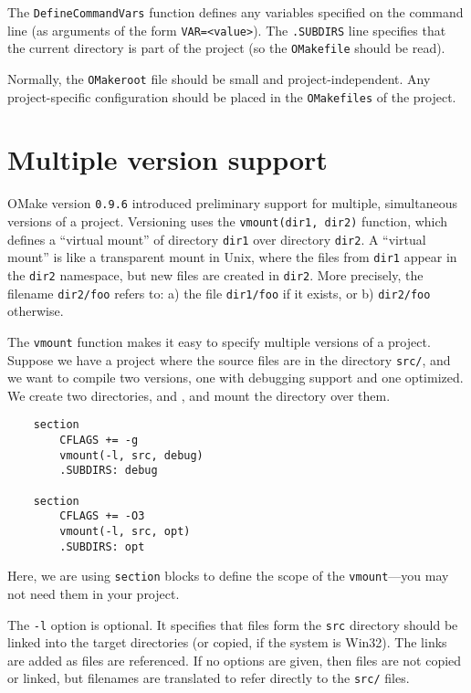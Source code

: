 The \verb+DefineCommandVars+ function defines any variables specified on the command line (as
arguments of the form \verb+VAR=<value>+).  The \verb+.SUBDIRS+ line specifies that the current
directory is part of the project (so the \verb+OMakefile+ should be read).

Normally, the \verb+OMakeroot+ file should be small and project-independent.  Any project-specific
configuration should be placed in the \verb+OMakefiles+ of the project.

\section{Multiple version support}

OMake version \verb+0.9.6+ introduced preliminary support for multiple, simultaneous versions of a
project.  Versioning uses the \verb+vmount(dir1, dir2)+ function, which defines a ``virtual mount''
of directory \verb+dir1+ over directory \verb+dir2+.  A ``virtual mount'' is like a transparent
mount in Unix, where the files from \verb+dir1+ appear in the \verb+dir2+ namespace, but new files
are created in \verb+dir2+.  More precisely, the filename \verb+dir2/foo+ refers to: a) the file
\verb+dir1/foo+ if it exists, or b) \verb+dir2/foo+ otherwise.

The \verb+vmount+ function makes it easy to specify multiple versions of a project.  Suppose we have
a project where the source files are in the directory \verb+src/+, and we want to compile two
versions, one with debugging support and one optimized.  We create two directories,  and
, and mount the  directory over them.

\begin{verbatim}
    section
        CFLAGS += -g
        vmount(-l, src, debug)
        .SUBDIRS: debug

    section
        CFLAGS += -O3
        vmount(-l, src, opt)
        .SUBDIRS: opt
\end{verbatim}

Here, we are using \verb+section+ blocks to define the scope of the \verb+vmount+---you may not need
them in your project.

The \verb+-l+ option is optional.  It specifies that files form the \verb+src+ directory should be
linked into the target directories (or copied, if the system is Win32).  The links are added as
files are referenced.  If no options are given, then files are not copied or linked, but filenames
are translated to refer directly to the \verb+src/+ files.

